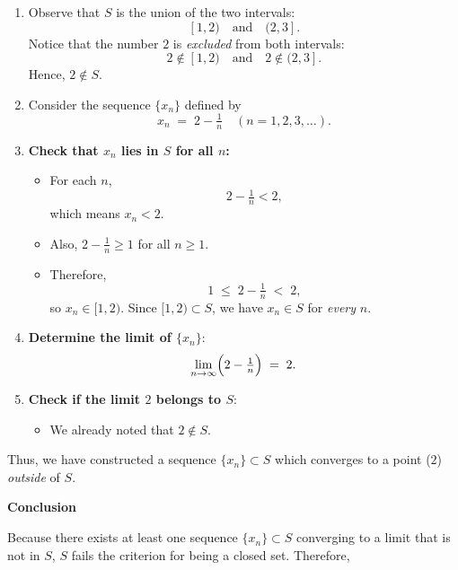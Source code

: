 \documentclass[12pt]{article}
\begin{document}
\begin{enumerate}
    \item Observe that \( S \) is the union of the two intervals:
    \[
    [1,2) \quad \text{and} \quad (2,3].
    \]
    Notice that the number \( 2 \) is \textit{excluded} from both intervals:
    \[
    2 \notin [1,2) 
    \quad \text{and} \quad 
    2 \notin (2,3].
    \]
    Hence, \( 2 \notin S \).
    
    \item Consider the sequence \( \{x_n\} \) defined by  
    \[
    x_n \;=\; 2 - \tfrac{1}{n} \quad (n = 1, 2, 3, \dots).
    \]
    
    \item \textbf{Check that \( x_n \) lies in \( S \) for all \( n \):}  
    \begin{itemize}
        \item For each \( n \),
        \[
        2 - \tfrac{1}{n} < 2,
        \]
        which means \( x_n < 2 \).
        
        \item Also, \( 2 - \tfrac{1}{n} \geq 1 \) for all \( n \geq 1 \).
        
        \item Therefore,
        \[
        1 \;\leq\; 2 - \tfrac{1}{n} \;<\; 2,
        \]
        so \( x_n \in [1,2) \). Since \( [1,2) \subset S \), we have \( x_n \in S \) for \textit{every} \( n \).
    \end{itemize}
    
    \item \textbf{Determine the limit of \( \{x_n\} \)}:  
    \[
    \lim_{n \to \infty} \Bigl(2 - \tfrac{1}{n}\Bigr) \;=\; 2.
    \]
    
    \item \textbf{Check if the limit \( 2 \) belongs to \( S \)}:  
    \begin{itemize}
        \item We already noted that \( 2 \notin S \).
    \end{itemize}
\end{enumerate}

Thus, we have constructed a sequence \( \{x_n\} \subset S \) which converges to a point (\( 2 \)) \textit{outside} of \( S \).

\bigskip

\noindent \textbf{Conclusion}

Because there exists at least one sequence \( \{x_n\} \subset S \) converging to a limit that is not in \( S \), \( S \) fails the criterion for being a closed set. Therefore,
\end{document}

